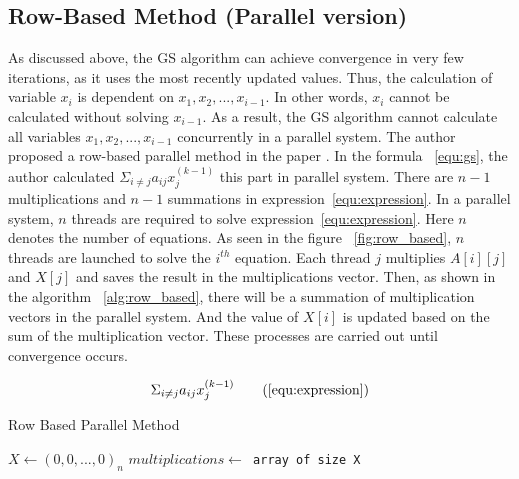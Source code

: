 \documentclass[11pt]{article}       %
\begin{document}
\subsection{Row-Based Method (Parallel version)}

As discussed above, the GS algorithm can achieve convergence in very few iterations, as it uses the most recently updated values. Thus, the calculation of variable $x_i$ is dependent on $x_1, x_2,...,x_{i-1}$. In other words, ${x_i}$ cannot be calculated without solving $x_{i-1}$. As a result, the GS algorithm cannot calculate all variables $x_1, x_2,...,x_{i-1}$ concurrently in a parallel system. The author proposed a row-based parallel method in the paper \cite{row-based}. In the formula ~\eqref{equ:gs}, the author calculated $\Sigma_{i \ne j}a_{ij}x_j^{(k-1)}$ this part in parallel system. There are $n-1$ multiplications and $n-1$ summations in expression~\eqref{equ:expression}. In a parallel system, $n$ threads are required to solve expression~\eqref{equ:expression}. Here $n$ denotes the number of equations. As seen in the figure ~\ref{fig:row_based}, $n$ threads are launched to solve the $i^{th}$ equation. Each thread $j$ multiplies $A[i][j]$ and $X[j]$ and saves the result in the multiplications vector. Then, as shown in the algorithm ~\ref{alg:row_based}, there will be a summation of multiplication vectors in the parallel system. And the value of $X[i]$ is updated based on the sum of the multiplication vector. These processes are carried out until convergence occurs.

\begin{subequations}\label{equ:expression}
\begin{align*}
\Sigma_{i \ne j}a_{ij}x_j^{(k-1)}
\tag{\ref{equ:expression}}
\end{align*}
\end{subequations}

\begin{algorithm}
\DontPrintSemicolon 
{}
\caption{Row Based Parallel Method}\label{alg:row_based}
$X \gets (0,0,...,0)_n$\;
 \texttt{$multiplications \gets$ array of size X} 
\end{algorithm}
\end{document}
